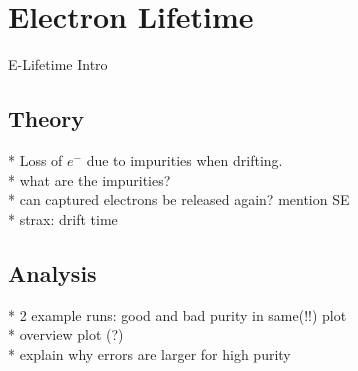
\section{Electron Lifetime}
\label{sec:elifetime}


E-Lifetime Intro

\subsection{Theory}

* Loss of $e^{-}$ due to impurities when drifting. \\
* what are the impurities? \\
* can captured electrons be released again? mention SE \\
* strax: drift time


\subsection{Analysis}

* 2 example runs: good and bad purity in same(!!) plot \\
* overview plot (?) \\
* explain why errors are larger for high purity



